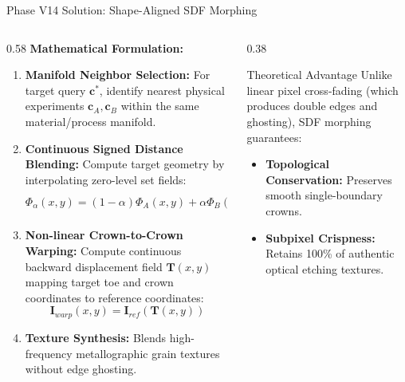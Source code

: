 \documentclass[aspectratio=169]{beamer}
\begin{document}
\begin{frame}{Phase V14 Solution: Shape-Aligned SDF Morphing}
	\begin{columns}[T]
		\begin{column}{0.58\textwidth}
			\textbf{Mathematical Formulation:}
			\begin{enumerate}
				\item \textbf{Manifold Neighbor Selection:}
				For target query $\mathbf{c}^*$, identify nearest physical experiments $\mathbf{c}_A, \mathbf{c}_B$ within the same material/process manifold.
				\item \textbf{Continuous Signed Distance Blending:}
				Compute target geometry by interpolating zero-level set fields:
				$$\Phi_\alpha(x, y) = (1 - \alpha) \Phi_A(x, y) + \alpha \Phi_B(x, y), \quad \alpha = \frac{\|\mathbf{c}^* - \mathbf{c}_A\|}{\|\mathbf{c}_B - \mathbf{c}_A\|}$$
				\item \textbf{Non-linear Crown-to-Crown Warping:}
				Compute continuous backward displacement field $\mathbf{T}(x, y)$ mapping target toe and crown coordinates to reference coordinates:
				$$\mathbf{I}_{warp}(x, y) = \mathbf{I}_{ref}(\mathbf{T}(x, y))$$
				\item \textbf{Texture Synthesis:}
				Blends high-frequency metallographic grain textures without edge ghosting.
			\end{enumerate}
		\end{column}
		\begin{column}{0.38\textwidth}
			\begin{block}{Theoretical Advantage}
				Unlike linear pixel cross-fading (which produces double edges and ghosting), SDF morphing guarantees:
				\begin{itemize}
					\item \textbf{Topological Conservation:} Preserves smooth single-boundary crowns.
					\item \textbf{Subpixel Crispness:} Retains 100\% of authentic optical etching textures.
				\end{itemize}
			\end{block}
		\end{column}
	\end{columns}
\end{frame}
\end{document}
